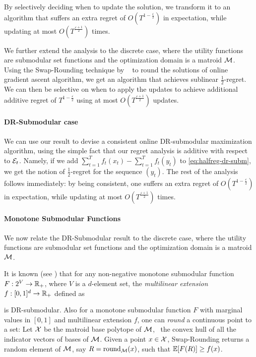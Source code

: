  
By selectively deciding when to update the solution, we transform it to an algorithm that suffers an extra regret of $O(T^{1-\frac{\varepsilon}{2}})$ in expectation, while updating at most $O(T^{\frac{\varepsilon + 1}{2}})$ times.

We further extend the analysis to the discrete case, where the utility functions are submodular set functions and the optimization domain is a matroid $\mathcal{M}$. Using the Swap-Rounding technique by ~\cite{Chekuri2009} to round the solutions of online gradient ascent algorithm, we get an algorithm  that achieves sublinear $\frac{1}{2}$-regret. We can then be selective on when to apply the updates to achieve additional additive regret of $T^{1 - \frac{\varepsilon}{2}}$ using at most $O(T^{\frac{\varepsilon + 1}{2}})$ updates. 


\paragraph{DR-Submodular case} 
We can use our result to devise a consistent online DR-submodular maximization algorithm, using the simple fact that our regret analysis is additive with respect to $\mathcal{E}_t$. Namely, if we add $\sum_{t=1}^T f_t(x_t) - \sum_{t=1}^T f_t(y_t)$ to \eqref{eq:halfreg-dr-subm}, we get the notion of $\frac{1}{2}$-regret for the sequence $(y_t)$. The rest of the analysis follows immediately: by being consistent, one suffers an extra regret of $O(T^{1-\frac{\varepsilon}{2}})$ in expectation, while updating at most $O(T^{\frac{\varepsilon + 1}{2}})$ times.

\paragraph{Monotone Submodular Functions} We now relate the DR-Submodular result to the discrete case, where the utility functions are submodular set functions and the optimization domain is a matroid $\mathcal{M}$. 

It is known (see \cite{Calinescu2011}) that for any non-negative monotone submodular function $F:2^V\to\mathbb{R}_+$, where $V$ is a $d$-element set, the \emph{multilinear extension} $f:[0,1]^d\to\mathbb{R}_+$ defined as 

is DR-submodular.
Also for a monotone submodular function $F$ with marginal values in $[0,1]$ and multilinear extension $f$, one can \emph{round} a continuous point to a set: Let $\mathcal{X}$ be the matroid base polytope of $\mathcal{M}$, \ie\ the convex hull of all the indicator vectors of bases of $\mathcal{M}$. Given a point $x\in \mathcal{X}$, Swap-Rounding \cite{Chekuri2009} returns a random element of $\mathcal{M}$, say $R = \mathrm{round}_{\mathcal{M}}(x)$, such that $\mathbb{E}[F(R)] \geq f(x)$. 

